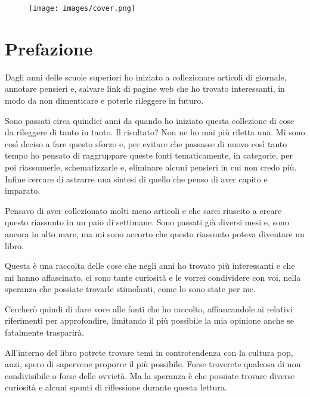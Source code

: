 \documentclass[12pt]{book} %
\date{2024-04-09}
\begin{document}
\begin{figure}[htbp]
    \centering
    \texttt{[image: images/cover.png]}
    \vspace{-\baselineskip} %
\end{figure}


\thispagestyle{empty}
\tableofcontents %
\markboth{}{}    %
\thispagestyle{empty}

\clearpage\section{Prefazione}
Dagli anni delle scuole superiori ho iniziato a collezionare articoli di giornale, annotare pensieri e, salvare link di
pagine web che ho trovato interessanti, in modo da non dimenticare e poterle rileggere in futuro.

Sono passati circa quindici anni da quando ho iniziato questa collezione di cose da rileggere di tanto in tanto. Il
risultato? Non ne ho mai più riletta una. Mi sono così deciso a fare questo sforzo e, per evitare che passasse di
nuovo così tanto tempo ho pensato di raggruppare queste fonti tematicamente, in categorie, per poi riassumerle,
schematizzarle e, eliminare alcuni pensieri in cui non credo più. Infine cercare di astrarre una sintesi di quello che
penso di aver capito e imparato. 

Pensavo di aver collezionato molti meno articoli e che sarei riuscito a creare questo riassunto in un paio di settimane.
Sono passati già diversi mesi e, sono ancora in alto mare, ma mi sono accorto che questo riassunto poteva diventare un libro.

Questa è una raccolta delle cose che negli anni ho trovato più
interessanti e che mi hanno affascinato, ci sono tante curiosità e le vorrei condividere con voi, nella speranza che
possiate trovarle stimolanti, come lo sono state per me.

Cercherò quindi di dare voce alle fonti che ho raccolto, affiancandole ai relativi riferimenti per approfondire,
limitando il più possibile la mia opinione anche se fatalmente trasparirà.

All'interno del libro potrete trovare temi in controtendenza con la cultura pop, anzi, spero di
sapervene proporre il più possibile. Forse troverete qualcosa di non condivisibile o forse delle ovvietà. Ma la
speranza è che possiate trovare diverse curiosità e alcuni spunti di riflessione durante questa lettura.
\end{document}
